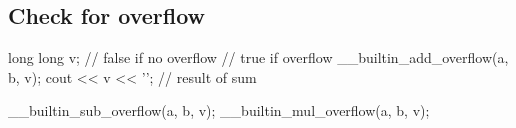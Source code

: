\subsection{Check for overflow}
long long v;
// false if no overflow
// true if overflow
__builtin_add_overflow(a, b, v);
cout << v << '\n'; // result of sum

__builtin_sub_overflow(a, b, v);
__builtin_mul_overflow(a, b, v);
